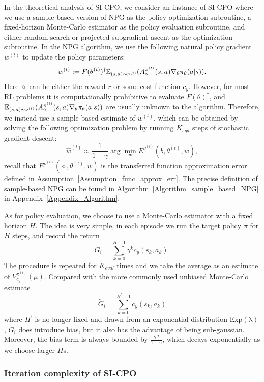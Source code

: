 In the theoretical analysis of SI-CPO, we consider an instance of SI-CPO where we use a sample-based version of NPG \citep{agarwal2021theory} as the policy optimization subroutine, a fixed-horizon Monte-Carlo estimator as the policy evaluation subroutine, and either random search or projected subgradient ascent as the optimization subroutine.
In the NPG algorithm, we use the following natural policy gradient $w^{(t)}$ to update the policy parameters:
$$
w^{(t)}:=F(\theta^{(t)})^\dagger{\mathbb E}_{(s,a)\sim\nu^{(t)}}(A^{\pi^{(t)}}_\diamond(s,a)\nabla_\theta\pi_\theta(a|s)).
$$
Here $\diamond$ can be either the reward $r$ or some cost function $c_y$.
However, for most RL problems it is computationally prohibitive to evaluate $F(\theta)^\dagger$, and ${\mathbb E}_{(s,a)\sim\nu^{(t)}}(A^{\pi^{(t)}}_\diamond(s,a)\nabla_\theta\pi_\theta(a|s))$ are usually unknown to the algorithm.
Therefore, we instead use a sample-based estimate of $w^{(t)}$, which can be obtained by solving the following optimization problem by running $K_{sgd}$ steps of stochastic gradient descent:
$$
\hat w^{(t)}\approx\frac{1}{1-\gamma}\arg\min_w E^{\nu^{(t)}}(b,\theta^{(t)},w),
$$
recall that $E^{\nu^{(t)}}(\diamond,\theta^{(t)},w)$ is the transferred function approximation error defined in Assumption~\ref{Assumption_func_approx_err}.
The precise definition of sample-based NPG can be found in Algorithm~\ref{Algorithm_sample_based_NPG} in Appendix~\ref{Appendix_Algorithm}.

As for policy evaluation, we choose to use a Monte-Carlo estimator with a fixed horizon $H$.
The idea is very simple, in each episode we run the target policy $\pi$ for $H$ steps, and record the return
$$
G_i=\sum_{k=0}^{H-1}\gamma^k c_y(s_k,a_k).
$$
The procedure is repeated for $K_{eval}$ times and we take the average as an estimate of $V_{c_y}^{\pi^{(t)}}(\mu)$.
Compared with the more commonly used unbiased Monte-Carlo estimate
$$\widetilde{G}_i=\sum_{k=0}^{H^\prime-1}c_y(s_k,a_k)
$$
where $H^\prime$ is no longer fixed and drawn from an exponential distribution $\mathrm{Exp(\lambda)}$, $G_i$ does introduce bias, but it also has the advantage of being sub-gaussian.
Moreover, the bias term is always bounded by $\frac{\gamma^H}{1-\gamma}$, which decays exponentially as we choose larger $H$s.

\subsubsection{Iteration complexity of SI-CPO}\label{Subsection_SICPO_Iteration_Complexity}

